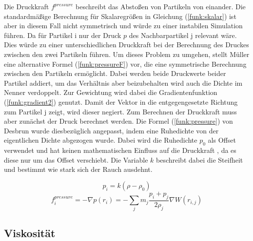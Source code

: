 \documentclass[intern,palatino]{cgBA}
\begin{document}
Die Druckkraft $f^{pressure}$ beschreibt das Abstoßen von Partikeln von einander. Die standardmäßige Berechnung für Skalaregrößen in Gleichung (\ref{funk:skalar}) ist aber in diesem Fall nicht symmetrisch und würde zu einer instabilen Simulation führen. Da für Partikel i nur der Druck $p$ des Nachbarpartikel j relevant wäre. Dies würde zu einer unterschiedlichen Druckkraft bei der Berechnung des Druckes zwischen den zwei Partikeln führen. Um dieses Problem zu umgehen, stellt Müller \cite{muller2003particle} eine alternative Formel (\ref{funk:pressureF}) vor, die eine symmetrische Berechnung zwischen den Partikeln ermöglicht. Dabei werden beide Druckwerte beider Partikel addiert, um das Verhältnis aber beizubehalten wird auch die Dichte im Nenner verdoppelt. Zur Gewichtung wird dabei die Gradientenfunktion (\ref{funk:gradient2}) genutzt. Damit der Vektor in die entgegengesetzte Richtung zum Partikel j zeigt, wird dieser negiert.
\newline
Zum Berechnen der Druckkraft muss aber zunächst der Druck berechnet werden. Die Formel (\ref{funk:pressure}) von Desbrun \cite{desbrun1996smoothed} wurde diesbezüglich angepasst, indem eine Ruhedichte von der eigentlichen Dichte abgezogen wurde. Dabei wird die Ruhedichte $p_0$ als Offset verwendet und hat keinen mathematischen Einfluss auf die Druckkraft \cite{muller2003particle}, da es diese nur um das Offset verschiebt. Die Variable $k$ beschreibt dabei die Steifheit und bestimmt wie stark sich der Rauch ausdehnt.

\begin{equation}\label{funk:pressure}
p_i = k(\rho - \rho_0)
\end{equation}
\begin{equation}\label{funk:pressureF}
f^{pressure}_i = - \nabla p(r_i) = - \sum_j m_j \frac{p_i+p_j}{2\rho_j} \nabla W(r_{i,j})
\end{equation}


\subsection{Viskosität}\label{visc}
\end{document}
